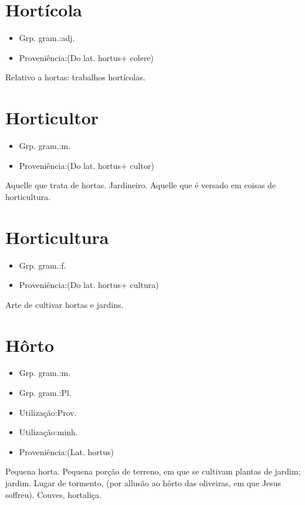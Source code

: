 \documentclass{article}
\begin{document}
\section{Hortícola}
\begin{itemize}
\item {Grp. gram.:adj.}
\end{itemize}
\begin{itemize}
\item {Proveniência:(Do lat. \textunderscore hortus\textunderscore  + \textunderscore colere\textunderscore )}
\end{itemize}
Relativo a hortas: \textunderscore trabalhos hortícolas\textunderscore .
\section{Horticultor}
\begin{itemize}
\item {Grp. gram.:m.}
\end{itemize}
\begin{itemize}
\item {Proveniência:(Do lat. \textunderscore hortus\textunderscore  + \textunderscore cultor\textunderscore )}
\end{itemize}
Aquelle que trata de hortas.
Jardineiro.
Aquelle que é versado em coisas de horticultura.
\section{Horticultura}
\begin{itemize}
\item {Grp. gram.:f.}
\end{itemize}
\begin{itemize}
\item {Proveniência:(Do lat. \textunderscore hortus\textunderscore  + \textunderscore cultura\textunderscore )}
\end{itemize}
Arte de cultivar hortas e jardins.
\section{Hôrto}
\begin{itemize}
\item {Grp. gram.:m.}
\end{itemize}
\begin{itemize}
\item {Grp. gram.:Pl.}
\end{itemize}
\begin{itemize}
\item {Utilização:Prov.}
\end{itemize}
\begin{itemize}
\item {Utilização:minh.}
\end{itemize}
\begin{itemize}
\item {Proveniência:(Lat. \textunderscore hortus\textunderscore )}
\end{itemize}
Pequena horta.
Pequena porção de terreno, em que se cultivam plantas de jardim; jardim.
Lugar de tormento, (por allusão ao hôrto das oliveiras, em que Jesus soffreu).
Couves, hortaliça.
\end{document}
